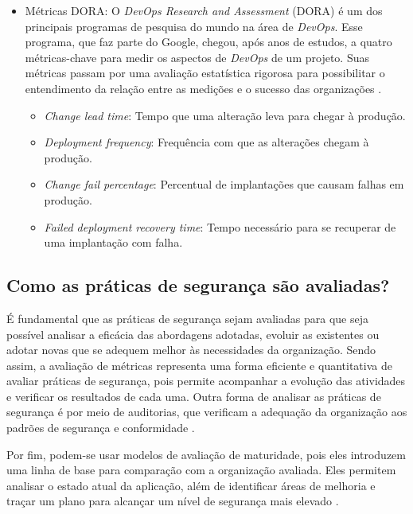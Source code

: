 \begin{itemize}
\begin{itemize}
        \item \textit{Errors Per Time Unit}: Taxa de erros em determinada unidade de tempo.
    \end{itemize}   
    \item Métricas DORA: O \textit{DevOps Research and Assessment} (DORA) é um dos principais programas de pesquisa do mundo na área de \textit{DevOps}. Esse programa, que faz parte do Google, chegou, após anos de estudos, a quatro métricas-chave para medir os aspectos de \textit{DevOps} de um projeto. Suas métricas passam por uma avaliação estatística rigorosa para possibilitar o entendimento da relação entre as medições e o sucesso das organizações \cite{DORA2024}. 
    \begin{itemize}
        \item \textit{Change lead time}: Tempo que uma alteração leva para chegar à produção.
        \item \textit{Deployment frequency}: Frequência com que as alterações chegam à produção.
        \item \textit{Change fail percentage}: Percentual de implantações que causam falhas em produção.
        \item \textit{Failed deployment recovery time}: Tempo necessário para se recuperar de uma implantação com falha.
    \end{itemize}  
\end{itemize}



\subsection{Como as práticas de segurança são avaliadas?}

É fundamental que as práticas de segurança sejam avaliadas para que seja possível analisar a eficácia das abordagens adotadas, evoluir as existentes ou adotar novas que se adequem melhor às necessidades da organização. Sendo assim, a avaliação de métricas representa uma forma eficiente e quantitativa de avaliar práticas de segurança, pois permite acompanhar a evolução das atividades e verificar os resultados de cada uma. Outra forma de analisar as práticas de segurança é por meio de auditorias, que verificam a adequação da organização aos padrões de segurança e conformidade \cite{Rajapakse2022}. 

Por fim, podem-se usar modelos de avaliação de maturidade, pois eles introduzem uma linha de base para comparação com a organização avaliada. Eles permitem analisar o estado atual da aplicação, além de identificar áreas de melhoria e traçar um plano para alcançar um nível de segurança mais elevado \cite{Lange2024}.

